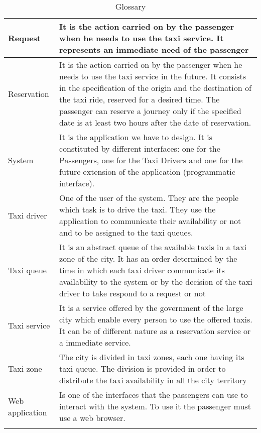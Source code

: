 \begin{center}
\begin{longtable}{| p{} | p{} |}
Request & It is the action carried on by the passenger when he needs to use the taxi service. It represents an immediate need of the passenger \\ \hline
Reservation & It is the action carried on by the passenger when he needs to use the taxi service in the future. It consists in the specification of the origin and the destination of the taxi ride, reserved for a desired time. The passenger can reserve a journey only if the specified date is at least two hours after the date of reservation. \\ \hline
System & It is the application we have to design. It is constituted by different interfaces: one for the Passengers, one for the Taxi Drivers and one for the future extension of the application (programmatic interface). \\ \hline
Taxi driver & One of the user of the system. They are the people which task is to drive the taxi. They use the application to communicate their availability or not and to be assigned to the taxi queues. \\ \hline
Taxi queue & It is an abstract queue of the available taxis in a taxi zone of the city. It has an order determined by the time in which each taxi driver communicate its availability to the system or by the decision of the taxi driver to take respond to a request or not \\ \hline
Taxi service & It is a service offered by the government of the large city which enable every person to use the offered taxis. It can be of different nature as a reservation service or a immediate service. \\ \hline
Taxi zone & The city is divided in taxi zones, each one having its taxi queue. The division is provided in order to distribute the taxi availability in all the city territory \\ \hline
Web application & Is one of the interfaces that the passengers can use to interact with the system. To use it the passenger must use a web browser. \\ \hline
\caption{Glossary}
\label{glossary}
\end{longtable}
\end{center}
